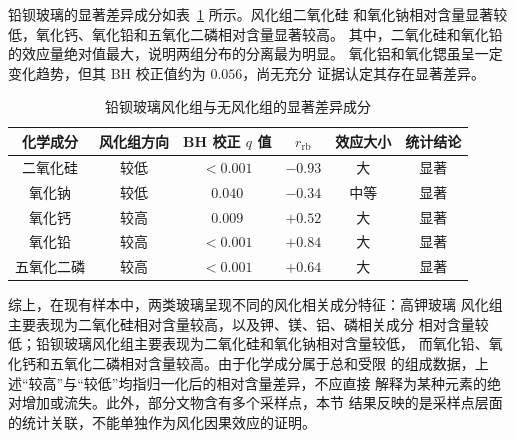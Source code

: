 铅钡玻璃的显著差异成分如表~\ref{tab:q1b-pbba} 所示。风化组二氧化硅
和氧化钠相对含量显著较低，氧化钙、氧化铅和五氧化二磷相对含量显著较高。
其中，二氧化硅和氧化铅的效应量绝对值最大，说明两组分布的分离最为明显。
氧化铝和氧化锶虽呈一定变化趋势，但其 BH 校正值约为 $0.056$，尚无充分
证据认定其存在显著差异。

\begin{table}[H]
    \centering
    \caption{铅钡玻璃风化组与无风化组的显著差异成分}
    \label{tab:q1b-pbba}
    \small
    \begin{tabular}{cccccc}
        \toprule
        化学成分 & 风化组方向 & BH 校正 $q$ 值 & $r_{\mathrm{rb}}$ & 效应大小 & 统计结论 \\
        \midrule
        二氧化硅       & 较低 & $<0.001$ & $-0.93$ & 大   & 显著 \\
        氧化钠         & 较低 & $0.040$  & $-0.34$ & 中等 & 显著 \\
        氧化钙         & 较高 & $0.009$  & $+0.52$ & 大   & 显著 \\
        氧化铅         & 较高 & $<0.001$ & $+0.84$ & 大   & 显著 \\
        五氧化二磷     & 较高 & $<0.001$ & $+0.64$ & 大   & 显著 \\
        \bottomrule
    \end{tabular}
\end{table}

综上，在现有样本中，两类玻璃呈现不同的风化相关成分特征：高钾玻璃
风化组主要表现为二氧化硅相对含量较高，以及钾、镁、铝、磷相关成分
相对含量较低；铅钡玻璃风化组主要表现为二氧化硅和氧化钠相对含量较低，
而氧化铅、氧化钙和五氧化二磷相对含量较高。由于化学成分属于总和受限
的组成数据，上述“较高”与“较低”均指归一化后的相对含量差异，不应直接
解释为某种元素的绝对增加或流失。此外，部分文物含有多个采样点，本节
结果反映的是采样点层面的统计关联，不能单独作为风化因果效应的证明。
